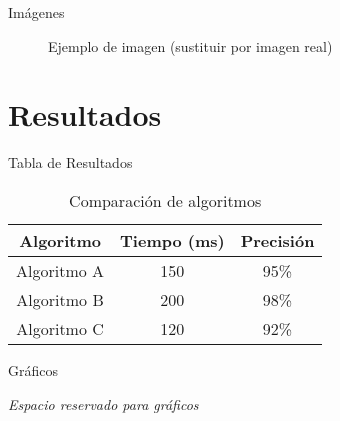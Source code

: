 \documentclass[aspectratio=169]{beamer}
\begin{document}
\begin{comment}
\begin{frame}[fragile]{Código}
    \begin{lstlisting}[language=Python, caption=Ejemplo de código Python]
def fibonacci(n):
    """Calcula el n-ésimo número de Fibonacci"""
    if n <= 1:
        return n
    else:
        return fibonacci(n-1) + fibonacci(n-2)

# Ejemplo de uso
print(fibonacci(10))
    \end{lstlisting}
\end{frame}
\end{comment}


\begin{frame}{Imágenes}
    \begin{figure}
        \centering
        \caption{Ejemplo de imagen (sustituir por imagen real)}
    \end{figure}
\end{frame}

\section{Resultados}

\begin{frame}{Tabla de Resultados}
    \begin{table}
        \centering
        \begin{tabular}{|c|c|c|}
            \hline
            \textbf{Algoritmo} & \textbf{Tiempo (ms)} & \textbf{Precisión} \\
            \hline
            Algoritmo A & 150 & 95\% \\
            \hline
            Algoritmo B & 200 & 98\% \\
            \hline
            Algoritmo C & 120 & 92\% \\
            \hline
        \end{tabular}
        \caption{Comparación de algoritmos}
    \end{table}
\end{frame}

\begin{frame}{Gráficos}
    \begin{center}
        \textit{Espacio reservado para gráficos}
    \end{center}
\end{frame}
\end{document}
